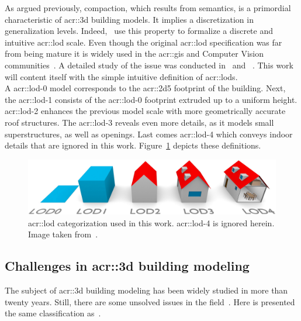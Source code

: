             As argued previously, compaction, which results from semantics, is a primordial characteristic of \gls{acr::3d} building models.
            It implies a discretization in generalization levels.
            Indeed,~\textcite{groger2012citygml} use this property to formalize a discrete and intuitive \acrfull{acr::lod} scale.
            Even though the original \gls{acr::lod} specification was far from being mature it is widely used in the \gls{acr::gis} and Computer Vision communities~\parencite{rau2006lod,biljecki2014formalisation}.
            A detailed study of the issue was conducted in~\textcite{biljecki2014formalisation} and ~\textcite{biljecki2016improved}.
            This work will content itself with the simple intuitive definition of \glspl{acr::lod}.\\
            A \gls{acr::lod}-0 model corresponds to the \gls{acr::2d5} footprint of the building.
            Next, the \gls{acr::lod}-1 consists of the \gls{acr::lod}-0 footprint extruded up to a uniform height.
            \gls{acr::lod}-2 enhances the previous model scale with more geometrically accurate roof structures.
            The \gls{acr::lod}-3 reveals even more details, as it models small superstructures, as well as openings.
            Last comes \gls{acr::lod}-4 which conveys indoor details that are ignored in this work.
            Figure~\ref{fig::lods} depicts these definitions.\\

            \begin{figure}[htb]
                \centering
                \includegraphics[width=.7\textwidth]{images/introduction/lods}            
                \caption[
                    \acrshort*{acr::lod} categorization used in this work.
                ]{
                    \label{fig::lods}
                    \gls{acr::lod} categorization used in this work.
                    \gls{acr::lod}-4 is ignored herein.
                    Image taken from~\parencite{biljecki2016improved}.
                }
            \end{figure}
    \subsection{Challenges in \texorpdfstring{\gls*{acr::3d}}{3D} building modeling}
        \label{subsec::introduction::urban_3d_reconstruction::challenges}
        The subject of \gls{acr::3d} building modeling has been widely studied in more than twenty years.
        Still, there are some unsolved issues in the field~\parencite{musialski2013survey, lafarge2015some}.
        Here is presented the same classification as~\parencite{lafarge2015some}.

